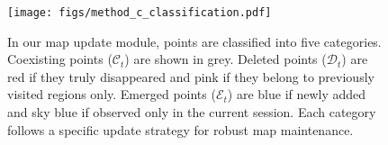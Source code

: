 \begin{figure}[!t]
    \centering
    \texttt{[image: figs/method\_c\_classification.pdf]}
    \caption{
    In our map update module, points are classified into five categories. 
    Coexisting points ($\mathcal{C}_t$) are shown in grey. 
    Deleted points ($\mathcal{D}_t$) are red if they truly disappeared and pink if they belong to previously visited regions only. 
    Emerged points ($\mathcal{E}_t$) are blue if newly added and sky blue if observed only in the current session. 
    Each category follows a specific update strategy for robust map maintenance.
    }
    \label{fig:method_c}
    \vspace{-3mm}
\end{figure}
